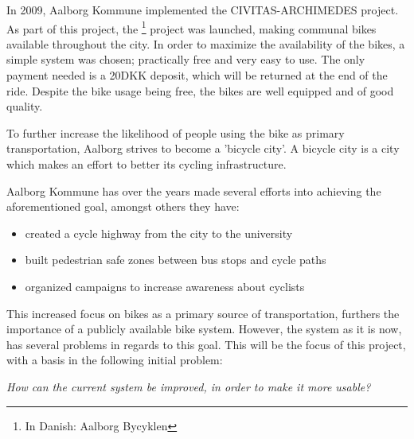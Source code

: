 In 2009, Aalborg Kommune implemented the CIVITAS-ARCHIMEDES project.\cite{civitas-archimedes}
As part of this project, the \citybike\footnote{In Danish: Aalborg Bycyklen} project was launched, making communal bikes available throughout the city.\cite{aalborgbycyklenbagcyklen}
In order to maximize the availability of the bikes, a simple system was chosen; practically free and very easy to use.
The only payment needed is a 20DKK deposit, which will be returned at the end of the ride.
Despite the bike usage being free, the bikes are well equipped and of good quality.\cite{cykelplanlaegning}

To further increase the likelihood of people using the bike as primary transportation, Aalborg strives to become a 'bicycle city'.
A bicycle city is a city which makes an effort to better its cycling infrastructure.\cite{cykelhandlingsplan}

Aalborg Kommune has over the years  made several efforts into achieving the aforementioned goal, amongst others they have:
\begin{itemize}
\item created a cycle highway from the city to the university\cite{cykelhandlingsplan}
\item built pedestrian safe zones between bus stops and cycle paths\cite{pedestriansafezone}
\item organized campaigns to increase awareness about cyclists\cite{cykelbycampaigns}
\end{itemize}

This increased focus on bikes as a primary source of transportation, furthers the importance of a publicly available bike system.
However, the system as it is now, has several problems in regards to this goal.
This will be the focus of this project, with a basis in the following initial problem:

\begin{center}
\textit{How can the current \citybike system be improved, in order to make it more usable?}
\end{center}